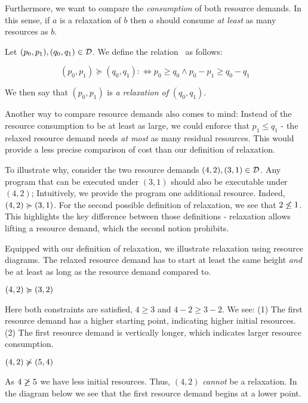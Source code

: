 Furthermore, we want to compare the \emph{consumption} of both resource demands. In this sense, if \(a\) is a relaxation of \(b\) then \(a\) should consume \emph{at least} as many resources as \(b\). 

\begin{definition}[Relaxation]\label{def:relaxation}
   Let \((p_0, p_1), (q_0, q_1) \in \mathcal{D}\). We define the relation \relaxation ~as follows:

   \[
      (p_0, p_1) \succcurlyeq (q_0, q_1) :\iff p_0 \geq q_0 \wedge p_0 - p_1 \geq q_0 - q_1
   \]
\end{definition}

We then say that \((p_0, p_1)\) is \emph{a relaxation of} \((q_0, q_1)\). 

Another way to compare resource demands also comes to mind: Instead of the resource consumption to be at least as large, we could enforce that \(p_1 \leq q_1\) - the relaxed resource demand needs \emph{at most} as many residual resources. This would provide a less precise comparison of cost than our definition of relaxation.

To illustrate why, consider the two resource demands \((4, 2), (3, 1) \in \mathcal{D}\). Any program that can be executed under \((3, 1)\) should also be executable under \((4, 2)\); Intuitively, we provide the program one additional resource. Indeed, \((4, 2) \succcurlyeq (3, 1)\). For the second possible definition of relaxation, we see that \(2 \centernot{\leq} 1\). This highlights the key difference between those definitions - relaxation allows lifting a resource demand, which the second notion prohibits.

Equipped with our definition of relaxation, we illustrate relaxation using resource diagrams. The relaxed resource demand has to start at least the same height \emph{and} be at least as long as the resource demand compared to. 

\begin{example}
   \((4, 2) \succcurlyeq (3, 2)\)

Here both constraints are satisfied, \(4 \geq 3\) and \(4 - 2 \geq 3 - 2\). We see: (1) The first resource demand has a higher starting point, indicating higher initial resources. (2) The first resource demand is vertically longer, which indicates larger resource consumption.


\end{example}

\begin{example}
   \((4,2) \notrelaxation (5, 4)\)

As \(4 \centernot{\geq} 5\) we have less initial resources. Thus, \((4,2)\) \emph{cannot} be a relaxation. In the diagram below we see that the first resource demand begins at a lower point.


\end{example}

